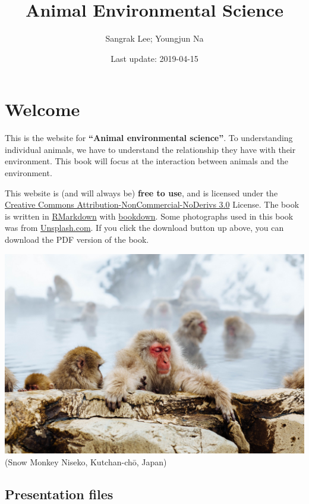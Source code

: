 \documentclass[]{book}
\title{Animal Environmental Science}
\author{Sangrak Lee; Youngjun Na}
\date{Last update: 2019-04-15}
\begin{document}
\maketitle

{
\setcounter{tocdepth}{1}
\tableofcontents
}
\chapter*{Welcome}\label{welcome}

This is the website for \textbf{``Animal environmental science''}. To
understanding individual animals, we have to understand the relationship
they have with their environment. This book will focus at the
interaction between animals and the environment.

This website is (and will always be) \textbf{free to use}, and is
licensed under the
\href{http://creativecommons.org/licenses/by-nc-nd/3.0/us/}{Creative
Commons Attribution-NonCommercial-NoDerivs 3.0} License. The book is
written in \href{https://rmarkdown.rstudio.com}{RMarkdown} with
\href{https://bookdown.org}{bookdown}. Some photographs used in this
book was from \href{https://unsplash.com/}{Unsplash.com}. If you click
the download button up above, you can download the PDF version of the
book.

\includegraphics{figures/monkey.jpeg}\\
(Snow Monkey Niseko, Kutchan-chō, Japan)

\section{Presentation files}\label{presentation-files}
\end{document}
